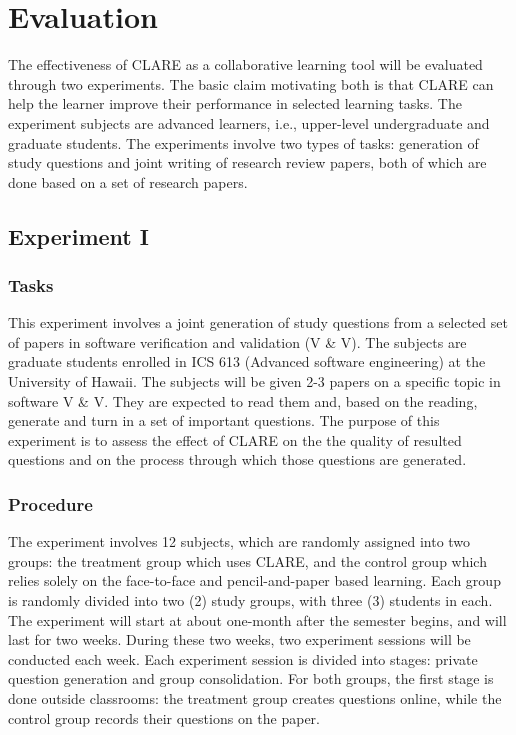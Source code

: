 \section{Evaluation}
\label{sec:evaluation}

The effectiveness of CLARE as a collaborative learning tool will be
evaluated through two experiments. The basic claim motivating both is that
CLARE can help the learner improve their performance in selected learning
tasks. The experiment subjects are advanced learners, i.e., upper-level
undergraduate and graduate students. The experiments involve two types of
tasks: generation of study questions and joint writing of research review
papers, both of which are done based on a set of research papers.

\subsection{Experiment I}

\subsubsection{Tasks} 

This experiment involves a joint generation of study questions from a
selected set of papers in software verification and validation (V \& V).
The subjects are graduate students enrolled in ICS 613 (Advanced software
engineering) at the University of Hawaii. The subjects will be given 2-3
papers on a specific topic in software V \& V. They are expected to read
them and, based on the reading, generate and turn in a set of important
questions. The purpose of this experiment is to assess the effect of CLARE
on the the quality of resulted questions and on the process through which
those questions are generated.

\subsubsection{Procedure}

The experiment involves 12 subjects, which are randomly assigned into two
groups: the treatment group which uses CLARE, and the control group which
relies solely on the face-to-face and pencil-and-paper based learning. Each
group is randomly divided into two (2) study groups, with three (3)
students in each. The experiment will start at about one-month after the
semester begins, and will last for two weeks. During these two weeks, two
experiment sessions will be conducted each week. Each experiment session is
divided into stages: private question generation and group consolidation.
For both groups, the first stage is done outside classrooms: the treatment
group creates questions online, while the control group records their
questions on the paper.

